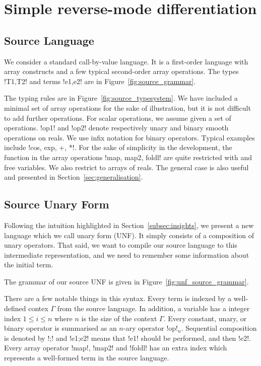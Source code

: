 \section{Simple reverse-mode differentiation}
\label{sec:simplediff}

\subsection{Source Language} 

We consider a standard call-by-value language. 
It is a first-order language with array constructs and a few typical second-order array operations. 
The types !T1,T2! and terms !e1,e2! are in Figure~\ref{fig:source_grammar}.



The typing rules are in Figure~\ref{fig:source_typesystem}. We have included a minimal set of array operations for the sake of illustration, 
but it is not difficult to add further operations. For scalar operations, we assume given a set of operations. 
!op1! and !op2! denote respectively unary and binary smooth operations on reals. 
We use infix notation for binary operators.
Typical examples include !cos, exp, +, *!. 
For the sake of simplicity in the development, the function in the array operations !map, map2, foldl! are quite restricted with and free variables. 
We also restrict to arrays of reals.
The general case is also useful and presented in Section~\ref{sec:generalisation}.



\subsection{Source Unary Form} 

Following the intuition highlighted in Section~\ref{subsec:insights}, we present a new language which we call unary form (UNF). 
It simply consists of a composition of unary operators. That said, we want to compile our source language to this intermediate representation, 
and we need to remember some information about the initial term. 

The grammar of our source UNF is given in Figure~\ref{fig:unf_source_grammar}. 



There are a few notable things in this syntax. 
Every term is indexed by a well-defined contex $\Gamma$ from the source language.
In addition, a variable has a integer index $1\leq i\leq n$ where $n$ is the size of the context $\Gamma$.
Every constant, unary, or binary operator is summarised as an $n$-ary operator !op!$_n$.
Sequential composition is denoted by !;! and !e1;e2! means that !e1! should be performed, and then !e2!.
Every array operator !map!, !map2! and !foldl! has an extra index which represents a well-formed term in the source language.

